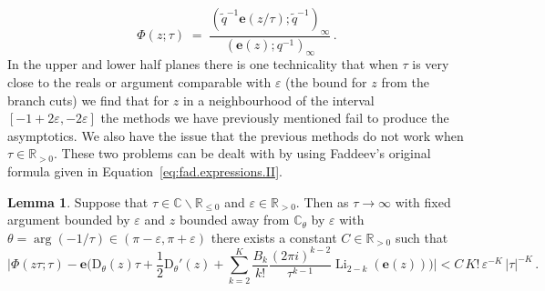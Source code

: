 \documentclass[12pt,reqno]{amsart}
\theoremstyle{definition}
\newtheorem{lemma}[theorem]{Lemma}
\def\BR{\mathbb R}
\def\BC{\mathbb C}
\def\be{\begin{equation}}
\def\ee{\end{equation}}
\def\e{\mathbf e}
\renewcommand{\=}{\;=\;}
\newcommand{\tq}{\widetilde q}
\newcommand{\Li}{\operatorname{Li}}
\begin{document}
\be
  \Phi(z;\tau)
  \=
  \frac{(\tq^{-1}\e(z/\tau);\tq^{-1})_{\infty}}{(\e(z);q^{-1})_{\infty}}\,.
\ee
In the upper and lower half planes there is one technicality that when $\tau$ is very close to the reals or argument comparable with $\varepsilon$ (the bound for $z$ from the branch cuts) we find that for $z$ in a neighbourhood of the interval $[-1+2\varepsilon,-2\varepsilon]$ the methods we have previously mentioned fail to produce the asymptotics. We also have the issue that the previous methods do not work when $\tau\in\BR_{>0}$. These two problems can be dealt with by using Faddeev's original formula given in Equation~\eqref{eq:fad.expressions.II}.
%
\begin{lemma}\label{lem:asymp.qpoch.3}
Suppose that $\tau\in\BC\backslash\BR_{\leq0}$ and $\varepsilon\in\BR_{>0}$. Then as $\tau\rightarrow \infty$ with fixed argument bounded by $\varepsilon$ and $z$ bounded away from $\BC_{\theta}$ by $\varepsilon$ with $\theta=\arg(-1/\tau)\in(\pi-\varepsilon,\pi+\varepsilon)$ there exists a constant $C\in\BR_{>0}$ such that
\be
    \Big|\Phi(z\tau;\tau)
    -
    \e\Big(\mathrm{D}_{\theta}(z)\tau
    +
    \frac{1}{2}\mathrm{D}_{\theta}'(z)
    +
    \sum_{k=2}^{K}\frac{B_k}{k!}\frac{(2\pi i)^{k-2}}{\tau^{k-1}}\Li_{2-k}(\e(z))\Big)
    \Big|
    <
    C\,K!\,\varepsilon^{-K}\,|\tau|^{-K}\,.
\ee
\end{lemma}
\end{document}
